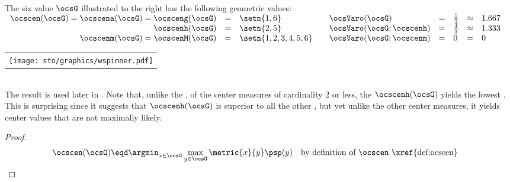 \begin{tabstr}{0.75}
\begin{example}
\label{ex:wspinner}\mbox{}\\
\begin{minipage}{\tw-35mm}%
The six value  $\ocsG$  
illustrated to the right has the following geometric values:
\\\indentx$\begin{array}{rcl@{\qquad}lclcl}
  \ocscen(\ocsG)=\ocscena(\ocsG)=\ocsceng(\ocsG) &=& \setn{1,6}         &\ocsVaro(\ocsG) &=& \frac{5}{3} &\approx& 1.667\\
  \ocscenh(\ocsG)                                &=& \setn{2,5}         &\ocsVaro(\ocsG;\ocscenh) &=& \frac{4}{3} &\approx& 1.333\\
  \ocscenm(\ocsG)=\ocscenM(\ocsG)                &=& \setn{1,2,3,4,5,6} &\ocsVaro(\ocsG;\ocscenm) &=& 0           &=&       0
\end{array}$
\end{minipage}\hfill%
\begin{tabular}{c}
  \gsize%
  \psset{unit=8mm}%
  \centering%
  {\texttt{[image: sto/graphics/wspinner.pdf]}}%
\end{tabular}\\
The  result is used later in .
Note that, unlike the  ,
of the center measures of cardinality 2 or less, the  $\ocscenh(\ocsG)$
yields the lowest  .
This is surprising since it suggests that $\ocscenh(\ocsG)$ is superior to 
all the other  ,
but yet unlike the other center measures, it yields center values that are not maximally likely.
\end{example}
\begin{proof}
  \begin{align*}
    \ocscen(\ocsG)
      &\eqd \argmin_{x\in\ocsG}\max_{y\in\ocsG}\metric{x}{y}\psp(y)
      &&\text{by definition of $\ocscen$ \xref{def:ocscen}}

\end{align*}
\end{proof}
\end{tabstr}
